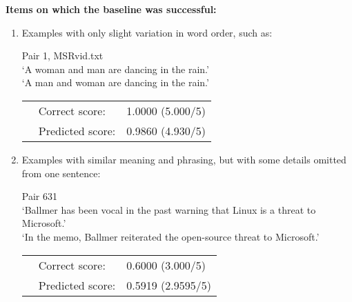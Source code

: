 \documentclass{article}
\begin{document}
\noindent\textbf{Items on which the baseline was successful:}
\begin{enumerate}
	\item Examples with only slight variation in word order, such as:
	
	Pair 1, MSRvid.txt\\
	`A woman and man are dancing in the rain.'\\
	`A man and woman are dancing in the rain.'\\
	 \begin{tabular}{lll}
		&	Correct score: & 1.0000 (5.000/5)\\
		& Predicted score: & 0.9860 (4.930/5)\\
	\end{tabular}

	
	\item Examples with similar meaning and phrasing, but with some details omitted from one sentence:
	
	Pair 631\\
	`Ballmer has been vocal in the past warning that Linux is a threat to Microsoft.'\\
	`In the memo, Ballmer reiterated the open-source threat to Microsoft.'\\
	 \begin{tabular}{lll}
		&	Correct score: & 0.6000 (3.000/5)\\
		& Predicted score: & 0.5919 (2.9595/5)\\
	\end{tabular}

	
\end{enumerate}
\end{document}
